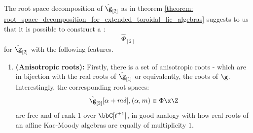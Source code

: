         \begin{remark} \label{remark: toroidal_root_systems}
            The root space decomposition of $\hat{\g}_{[2]}$ as in theorem \ref{theorem: root_space_decomposition_for_extended_toroidal_lie_algebras} suggests to us that it is possible to construct a :
                $$\hat{\Phi}_{[2]}$$
            for $\hat{\g}_{[2]}$ with the following features.
            \begin{enumerate}
                \item \textbf{(Anisotropic roots):} Firstly, there is a set of anisotropic roots - which are in bijection with the real roots of $\hat{\g}_{[1]}$ or equivalently, the roots of $\g$. Interestingly, the corresponding root spaces:
                    $$\hat{\g}_{[2]}[\alpha + m\delta], (\alpha, m) \in \Phi \x \Z$$
                are free and of rank $1$ over $\bbC[t^{\pm 1}]$, in good analogy with how real roots of an affine Kac-Moody algebras are equally of multiplicity $1$.


\end{enumerate}
\end{remark}
